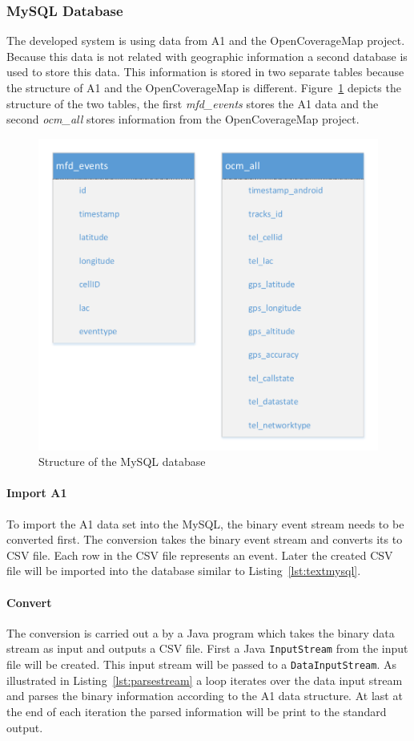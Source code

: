 \subsubsection{MySQL Database}
The developed system is using data from A1 and the OpenCoverageMap project. Because this data is not related with geographic information a second database is used to store this data. This information is stored in two separate tables because the structure of A1 and the OpenCoverageMap is different. Figure~\ref{fig:mysql_structure} depicts the structure of the two tables, the first \emph{mfd_events} stores the A1 data and the second \emph{ocm_all} stores information from the OpenCoverageMap project.
\begin{figure}
\centering
\includegraphics[width=0.7\linewidth]{./images/mysql_structure}
\caption{Structure of the MySQL database}
\label{fig:mysql_structure}
\end{figure}

\paragraph{Import A1}
To import the A1 data set into the MySQL, the binary event stream needs to be converted first. The conversion takes the binary event stream and converts its to CSV file. Each row in the CSV file represents an event. Later the created CSV file will be imported into the database similar to Listing~\ref{lst:textmysql}.
\paragraph{Convert}
The conversion is carried out a by a Java program which takes the binary data stream as input and outputs a CSV file. First a Java \verb|InputStream| from the input file will be created. This input stream will be passed to a \verb|DataInputStream|. As illustrated in Listing~\ref{lst:parsestream} a loop iterates over the data input stream and parses the binary information according to the A1 data structure. At last at the end of each iteration the parsed information will be print to the standard output.


